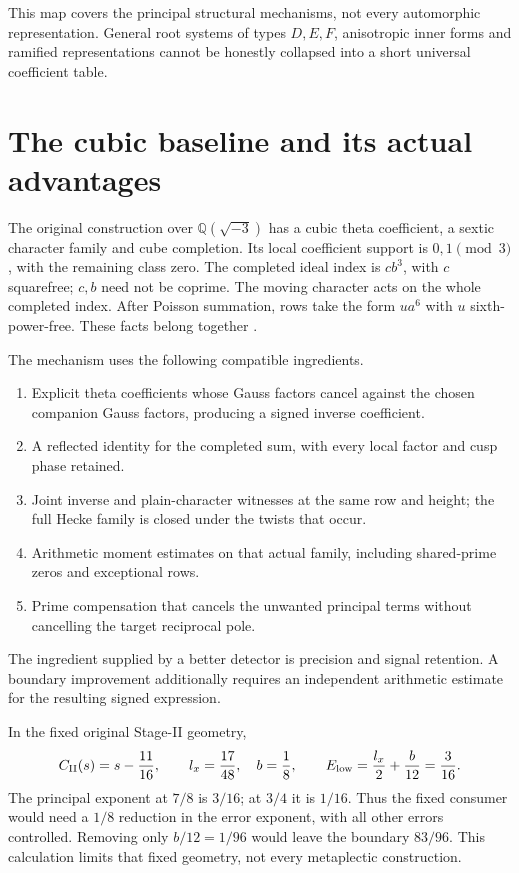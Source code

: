 \documentclass[11pt]{article}
\newcommand{\QQ}{\mathbb Q}
\begin{document}
This map covers the principal structural mechanisms, not every
automorphic representation. General root systems of types $D,E,F$,
anisotropic inner forms and ramified representations cannot be honestly
collapsed into a short universal coefficient table.

\section{The cubic baseline and its actual advantages}

The original construction over $\QQ(\sqrt{-3})$ has a cubic theta
coefficient, a sextic character family and cube completion. Its local
coefficient support is $0,1\pmod3$, with the remaining class zero.
The completed ideal index is $c b^3$, with $c$ squarefree; $c,b$ need
not be coprime. The moving character acts on the whole completed index.
After Poisson summation, rows take the form $u a^6$ with $u$ sixth-power-free.
These facts belong together \cite{QRH}.

The mechanism uses the following compatible ingredients.
\begin{enumerate}
\item Explicit theta coefficients whose Gauss factors cancel against
the chosen companion Gauss factors, producing a signed inverse coefficient.
\item A reflected identity for the completed sum, with every local
factor and cusp phase retained.
\item Joint inverse and plain-character witnesses at the same row and
height; the full Hecke family is closed under the twists that occur.
\item Arithmetic moment estimates on that actual family, including
shared-prime zeros and exceptional rows.
\item Prime compensation that cancels the unwanted principal terms
without cancelling the target reciprocal pole.
\end{enumerate}
The ingredient supplied by a better detector is precision and signal
retention. A boundary improvement additionally requires an independent
arithmetic estimate for the resulting signed expression.

In the fixed original Stage-II geometry,
\[
 C_{\mathrm{II}}(s)=s-\frac{11}{16},\qquad
 l_x=\frac{17}{48},\quad b=\frac18,\qquad
 E_{\rm low}=\frac{l_x}{2}+\frac b{12}=\frac3{16}.
\]
The principal exponent at $7/8$ is $3/16$; at $3/4$ it is $1/16$.
Thus the fixed consumer would need a $1/8$ reduction in the error
exponent, with all other errors controlled. Removing only $b/12=1/96$
would leave the boundary $83/96$. This calculation limits that fixed
geometry, not every metaplectic construction.
\end{document}
